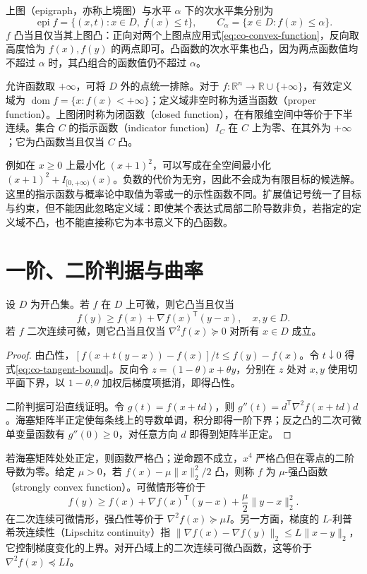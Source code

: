\documentclass[UTF8,12pt,a4paper,fontset=fandol]{ctexbook}
\begin{document}
上图（epigraph，亦称上境图）与水平 $\alpha$ 下的次水平集分别为
\[
 \operatorname{epi}f=\{(x,t):x\in D,\ f(x)\leq t\},\qquad
 C_\alpha=\{x\in D:f(x)\leq\alpha\}.
\]
$f$ 凸当且仅当其上图凸：正向对两个上图点应用式\eqref{eq:co-convex-function}，反向取高度恰为 $f(x),f(y)$ 的两点即可。凸函数的次水平集也凸，因为两点函数值均不超过 $\alpha$ 时，其凸组合的函数值仍不超过 $\alpha$。

允许函数取 $+\infty$，可将 $D$ 外的点统一排除。对于 $f:\mathbb R^n\to\mathbb R\cup\{+\infty\}$，有效定义域为 $\operatorname{dom}f=\{x:f(x)<+\infty\}$；定义域非空时称为适当函数（proper function）。上图闭时称为闭函数（closed function），在有限维空间中等价于下半连续。集合 $C$ 的指示函数（indicator function）$I_C$ 在 $C$ 上为零、在其外为 $+\infty$；它为凸函数当且仅当 $C$ 凸。

例如在 $x\geq0$ 上最小化 $(x+1)^2$，可以写成在全空间最小化 $(x+1)^2+I_{[0,+\infty)}(x)$。负数的代价为无穷，因此不会成为有限目标的候选解。这里的指示函数与概率论中取值为零或一的示性函数不同。扩展值记号统一了目标与约束，但不能因此忽略定义域：即使某个表达式局部二阶导数非负，若指定的定义域不凸，也不能直接称它为本书意义下的凸函数。

\section{一阶、二阶判据与曲率}

\begin{theorem}[微分判据]
设 $D$ 为开凸集。若 $f$ 在 $D$ 上可微，则它凸当且仅当
\begin{equation}
 f(y)\geq f(x)+\nabla f(x)^{\mathsf T}(y-x),\quad x,y\in D.
 \label{eq:co-tangent-bound}
\end{equation}
若 $f$ 二次连续可微，则它凸当且仅当 $\nabla^2f(x)\succeq0$ 对所有 $x\in D$ 成立。
\end{theorem}
\begin{proof}
由凸性，$[f(x+t(y-x))-f(x)]/t\leq f(y)-f(x)$。令 $t\downarrow0$ 得式\eqref{eq:co-tangent-bound}。反向令 $z=(1-\theta)x+\theta y$，分别在 $z$ 处对 $x,y$ 使用切平面下界，以 $1-\theta,\theta$ 加权后梯度项抵消，即得凸性。

二阶判据可沿直线证明。令 $g(t)=f(x+td)$，则 $g''(t)=d^{\mathsf T}\nabla^2f(x+td)d$。海塞矩阵半正定使每条线上的导数单调，积分即得一阶下界；反之凸的二次可微单变量函数有 $g''(0)\geq0$，对任意方向 $d$ 即得到矩阵半正定。
\end{proof}

若海塞矩阵处处正定，则函数严格凸；逆命题不成立，$x^4$ 严格凸但在零点的二阶导数为零。给定 $\mu>0$，若 $f(x)-\mu\|x\|_2^2/2$ 凸，则称 $f$ 为 $\mu$-强凸函数（strongly convex function）。可微情形等价于
\[
 f(y)\geq f(x)+\nabla f(x)^{\mathsf T}(y-x)+\frac\mu2\|y-x\|_2^2.
\]
在二次连续可微情形，强凸性等价于 $\nabla^2f(x)\succeq\mu I$。另一方面，梯度的 $L$-利普希茨连续性（Lipschitz continuity）指 $\|\nabla f(x)-\nabla f(y)\|_2\leq L\|x-y\|_2$，它控制梯度变化的上界。对开凸域上的二次连续可微凸函数，这等价于 $\nabla^2f(x)\preceq LI$。
\end{document}
